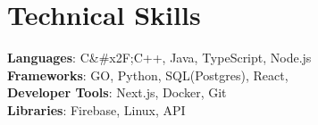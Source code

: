 \documentclass[letterpaper,11pt]{article}
\begin{document}
\section{Technical Skills}
\begin{itemize}[leftmargin=0.15in, label={}]
    \small{\item{
        \textbf{Languages}{: C&#x2F;C++, Java, TypeScript, Node.js } \\
        \textbf{Frameworks}{:  GO, Python, SQL(Postgres), React, } \\
        \textbf{Developer Tools}{:  Next.js, Docker, Git } \\
        \textbf{Libraries}{: Firebase, Linux, API }
    }}
\end{itemize}
\end{document}
